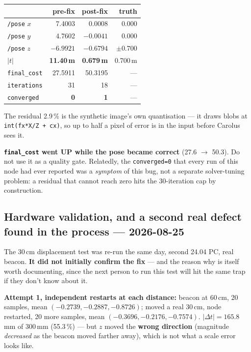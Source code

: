\documentclass[11pt]{report}
\newenvironment{warningbox}%
  {\begin{lrbox}{\warnbox}\begin{minipage}{0.90\textwidth}}%
  {\end{minipage}\end{lrbox}%
   \begin{center}\fcolorbox{black}{codebg}{\usebox{\warnbox}}\end{center}}
\begin{document}
\begin{center}
\begin{tabular}{@{}lrrr@{}}
\toprule
 & pre-fix & post-fix & truth \\
\midrule
\texttt{/pose} $x$ & 7.4003 & 0.0008 & 0.000 \\
\texttt{/pose} $y$ & 4.7602 & $-0.0041$ & 0.000 \\
\texttt{/pose} $z$ & $-6.9921$ & $-0.6794$ & $\pm0.700$ \\
$|t|$ & \textbf{11.40\,m} & \textbf{0.679\,m} & 0.700\,m \\
\texttt{final\_cost} & 27.5911 & 50.3195 & --- \\
\texttt{iterations} & 31 & 18 & --- \\
\texttt{converged} & \textbf{0} & \textbf{1} & --- \\
\bottomrule
\end{tabular}
\end{center}

The residual 2.9\,\% is the synthetic image's own quantisation --- it draws
blobs at \texttt{int(fx*X/Z + cx)}, so up to half a pixel of error is in the
input before Carolus sees it.

\begin{warningbox}
\textbf{\texttt{final\_cost} went UP while the pose became correct}
(27.6 $\rightarrow$ 50.3). Do not use it as a quality gate. Relatedly, the
\texttt{converged=0} that every run of this node had ever reported was a
\emph{symptom} of this bug, not a separate solver-tuning problem: a residual
that cannot reach zero hits the 30-iteration cap by construction.
\end{warningbox}

\subsection{Hardware validation, and a second real defect found in the process --- 2026-08-25}
\label{sec:bug088}

The 30\,cm displacement test was re-run the same day, second 24.04 PC, real
beacon. \textbf{It did not initially confirm the fix} --- and the reason why
is itself worth documenting, since the next person to run this test will hit
the same trap if they don't know about it.

\textbf{Attempt 1, independent restarts at each distance:} beacon at 60\,cm,
20 samples, mean $(-0.2739,-0.2887,-0.8726)$; moved a real 30\,cm, node
restarted, 20 more samples, mean $(-0.3696,-0.2176,-0.7574)$.
$|\Delta t| = 165.8$\,mm of 300\,mm (55.3\,\%) --- but $z$ moved the
\textbf{wrong direction} (magnitude \emph{decreased} as the beacon moved
farther away), which is not what a scale error looks like.
\end{document}
